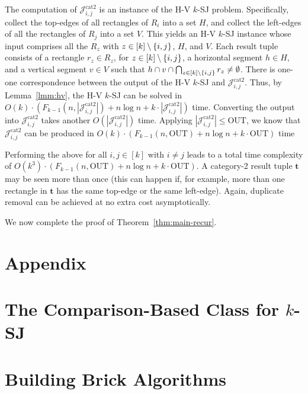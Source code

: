 \documentclass[sigconf]{acmart}
\def\vgap{\vspace{0mm}}
\def\J{\mathcal{J}}
\def\catt{\mathrm{cat2}}
\def\out{\mathrm{OUT}}
\begin{document}
{{{The computation of $\J^\catt_{i,j}$ is an instance of the H-V $k$-SJ problem. Specifically, collect the top-edges of all rectangles of $R_i$ into a set $H$, and collect the left-edges of all the rectangles of $R_j$ into a set $V$. This yields an H-V $k$-SJ instance whose input comprises all the $R_z$ with $z \in [k] \setminus \{i,j\}$,  $H$, and $V$. Each result tuple consists of a rectangle $r_z \in R_z$, for $z \in [k] \setminus \{i,j\}$, a horizontal segment $h \in H$, and a vertical segment $v \in V$ such that $h \cap v \cap \bigcap_{z \in [k] \setminus \{i,j\}} r_z \ne \emptyset$. There is one-one correspondence between the output of the H-V $k$-SJ and $\J^\catt_{i,j}$. Thus, by Lemma~\ref{lmm:hv}, the H-V $k$-SJ can be solved in $O(k) \cdot (F_{k-1}(n, |\J^\catt_{i,j}|) + n \log n + k \cdot |\J^\catt_{i,j}|)$ time. Converting the output into $\J^\catt_{i,j}$ takes another $O(|\J^\catt_{i,j}|)$ time. Applying $|\J^\catt_{i,j}| \le \out$, we know that $\J^\catt_{i,j}$ can be produced in $O(k) \cdot (F_{k-1}(n, \out) + n \log n + k \cdot \out)$ time

\vgap 

Performing the above for all $i, j \in [k]$ with $i \ne j$ leads to a total time complexity of $O(k^3) \cdot (F_{k-1}(n, \out) + n \log n + k \cdot \out)$. A category-2 result tuple $\bm{t}$ may be seen more than once (this can happen if, for example, more than one rectangle in $\bm{t}$ has the same top-edge or the same left-edge). Again, duplicate removal can be achieved at no extra cost asymptotically.

\vgap 

We now complete the proof of Theorem~\ref{thm:main-recur}.




\balance

\appendix 

\def\vgap{\vspace{1mm}}

\section*{Appendix}

\section{The Comparison-Based Class for $k$-SJ} \label{app:comp-class}

\section{Building Brick Algorithms} \label{app:bricks}

}}}
\end{document}
